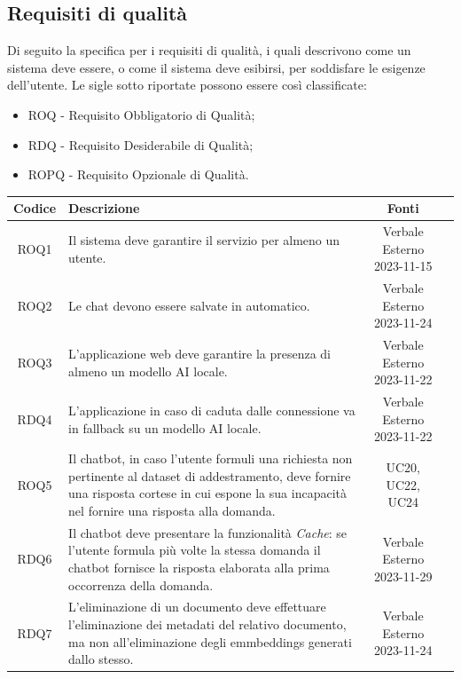 \documentclass[10pt, a4paper]{article}
\begin{document}
\subsection{Requisiti di qualità}
Di seguito la specifica per i requisiti di qualità, i quali descrivono come un sistema deve essere, o
come il sistema deve esibirsi, per soddisfare le esigenze dell'utente.
Le sigle sotto riportate possono essere così classificate:
\begin{itemize}
    \item ROQ - Requisito Obbligatorio di Qualità;
    \item RDQ - Requisito Desiderabile di Qualità;
    \item ROPQ - Requisito Opzionale di Qualità.
\end{itemize}
\renewcommand{\arraystretch}{1.5}
\begin{tabularx}{\textwidth}{|c|X|c|c}\hline
\textbf{Codice} & \textbf{Descrizione}  & \textbf{Fonti} \\
\hline ROQ1 & Il sistema deve garantire il servizio per almeno un utente. & Verbale Esterno 2023-11-15 \\
\hline ROQ2 & Le chat devono essere salvate in automatico. & Verbale Esterno 2023-11-24 \\
\hline ROQ3 & L'applicazione web deve garantire la presenza di almeno un modello AI locale. & Verbale Esterno 2023-11-22 \\
\hline RDQ4 & L'applicazione in caso di caduta dalle connessione va in fallback su un modello AI locale. & Verbale Esterno 2023-11-22 \\
\hline ROQ5 & Il chatbot, in caso l'utente formuli una richiesta non pertinente al dataset di addestramento, deve fornire una risposta cortese in cui espone la sua incapacità nel fornire una risposta alla domanda. & UC20, UC22, UC24 \\ 
\hline RDQ6 & Il chatbot deve presentare la funzionalità \textit{Cache}: se l'utente formula più volte la stessa domanda il chatbot fornisce la risposta elaborata alla prima occorrenza della domanda. & Verbale Esterno 2023-11-29 \\
\hline RDQ7 & L'eliminazione di un documento deve effettuare l'eliminazione dei metadati del relativo documento, ma non all'eliminazione degli emmbeddings generati dallo stesso. & Verbale Esterno 2023-11-24 \\
\hline
\end{tabularx}
\end{document}
